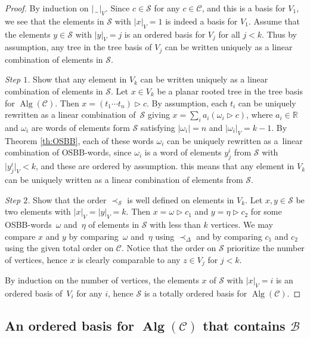 \documentclass[10pt,a4paper]{amsart}
\newcommand*{\Alg}{\operatorname{Alg}}
\newcommand{\noarg}{\,\_\,}
\numberwithin{equation}{section}
\begin{document}
\begin{proof}
 By induction on $|\noarg|_V$. Since $c \in \mathcal{S}$ for any $c \in \mathcal{C}$, and this is a basis for $V_1$, we see that the elements in $\mathcal{S}$ with $|x|_V=1$ is indeed a basis for $V_1$. Assume that the elements $y \in \mathcal{S}$ with $|y|_V= j$ is an ordered basis for $V_j$ for all $j<k$. Thus by assumption, any tree in the tree basis of $V_j$ can be written uniquely as a linear combination of elements in $\mathcal{S}$.

 \textit{Step $1$.} Show that any element in $V_k$ can be written uniquely as a linear combination of elements in $\mathcal{S}$. Let $x \in V_k$ be a planar rooted tree in the tree basis for $\Alg(\mathcal{C})$. Then $x = (t_1 \cdots t_n) \rhd c$. By assumption, each $t_i$ can be uniquely rewritten as a linear combination of~$\mathcal{S}$ giving $x = \sum_i a_i (\omega_i \rhd c)$, where $a_i \in \mathbb{R}$ and $\omega_i$ are words of elements form $\mathcal{S}$ satisfying $|\omega_i|=n$ and $|\omega_i|_V = k-1$. By Theorem \ref{th:OSBB}, each of these words $\omega_i$ can be uniquely rewritten as a~linear combination of OSBB-words, since $\omega_i$ is a word of elements $y^i_j$ from $\mathcal{S}$ with $\bigl|y^i_j\bigr|_V <k$, and these are ordered by assumption. this means that any element in $V_k$ can be uniquely written as a linear combination of elements from $\mathcal{S}$.

 \textit{Step $2$.} Show that the order $\prec_{\mathcal{S}}$ is well defined on elements in $V_k$. Let $x , y\in \mathcal{S}$ be two elements with $|x|_V = |y|_V = k$. Then $x = \omega \rhd c_1$ and $y= \eta \rhd c_2$ for some OSBB-words~$\omega$ and~$\eta$ of elements in $\mathcal{S}$ with less than $k$ vertices. We may compare $x$ and $y$ by comparing~$\omega$ and~$\eta$ using $\prec_{\Delta}$ and by comparing $c_1$ and $c_2$ using the given total order on $\mathcal{C}$. Notice that the order on $\mathcal{S}$ prioritize the number of vertices, hence $x$ is clearly comparable to any $z \in V_j$ for $j<k$.

 By induction on the number of vertices, the elements $x$ of $\mathcal{S}$ with $|x|_V=i$ is an ordered basis of~$V_i$ for any $i$, hence $\mathcal{S}$ is a totally ordered basis for $\Alg(\mathcal{C})$.
\end{proof}

\subsection[An ordered basis for Alg(C) that contains B]{An ordered basis for $\boldsymbol{\Alg(\mathcal{C})}$ that contains $\boldsymbol{\mathcal{B}}$}%
\end{document}
